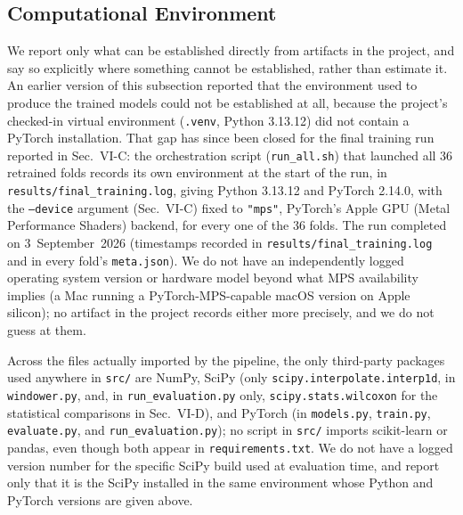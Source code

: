 \documentclass[conference]{IEEEtran}
\begin{document}
\subsection{Computational Environment}
\label{subsec:compute-env}

We report only what can be established directly from artifacts in
the project, and say so explicitly where something cannot be
established, rather than estimate it. An earlier version of this
subsection reported that the environment used to produce the trained
models could not be established at all, because the project's
checked-in virtual environment (\texttt{.venv}, Python 3.13.12) did
not contain a PyTorch installation. That gap has since been closed
for the final training run reported in Sec.~VI-C: the orchestration
script (\texttt{run\_all.sh}) that launched all 36 retrained folds
records its own environment at the start of the run, in
\texttt{results/final\_training.log}, giving Python 3.13.12 and
PyTorch 2.14.0, with the \texttt{--device} argument (Sec.~VI-C) fixed
to \texttt{"mps"}, PyTorch's Apple GPU (Metal Performance Shaders)
backend, for every one of the 36 folds. The run completed on
3~September~2026 (timestamps recorded in
\texttt{results/final\_training.log} and in every fold's
\texttt{meta.json}). We do not have an independently logged operating
system version or hardware model beyond what MPS availability
implies (a Mac running a PyTorch-MPS-capable macOS version on Apple
silicon); no artifact in the project records either more precisely,
and we do not guess at them.

Across the files actually imported by the pipeline, the only
third-party packages used anywhere in \texttt{src/} are NumPy,
SciPy (only \texttt{scipy.interpolate.interp1d}, in
\texttt{windower.py}, and, in \texttt{run\_evaluation.py} only,
\texttt{scipy.stats.wilcoxon} for the statistical comparisons in
Sec.~VI-D), and PyTorch (in \texttt{models.py}, \texttt{train.py},
\texttt{evaluate.py}, and \texttt{run\_evaluation.py}); no script in
\texttt{src/} imports scikit-learn or pandas, even though both
appear in \texttt{requirements.txt}. We do not have a logged version
number for the specific SciPy build used at evaluation time, and
report only that it is the SciPy installed in the same environment
whose Python and PyTorch versions are given above.
\end{document}
